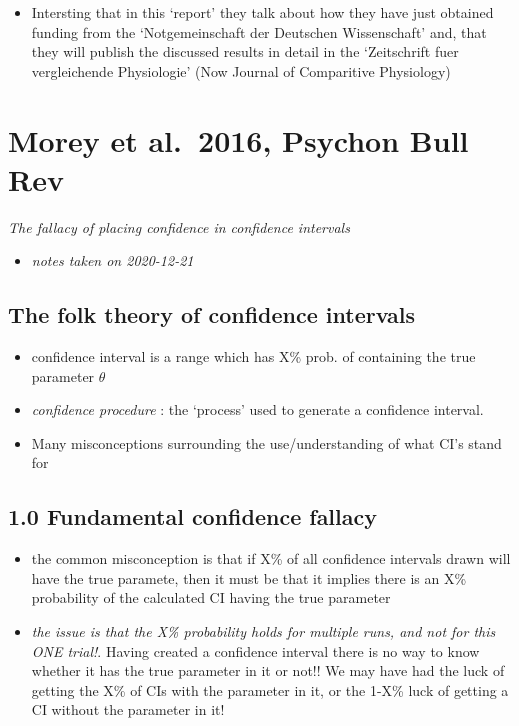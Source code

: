 \documentclass[
]{book}
\providecommand{\tightlist}{%
  \setlength{\itemsep}{0pt}\setlength{\parskip}{0pt}}
\begin{document}
\begin{itemize}
\tightlist
\item
  Intersting that in this `report' they talk about how they have just obtained funding from the `Notgemeinschaft der Deutschen Wissenschaft' and, that they will publish the discussed results in detail in the `Zeitschrift fuer vergleichende Physiologie' (Now Journal of Comparitive Physiology)
\end{itemize}

\hypertarget{morey-et-al.-2016-psychon-bull-rev}{%
\chapter{Morey et al.~2016, Psychon Bull Rev}\label{morey-et-al.-2016-psychon-bull-rev}}


\emph{The fallacy of placing confidence in confidence intervals} \citep{morey2016fallacy}

\begin{itemize}
\tightlist
\item
  \emph{notes taken on 2020-12-21}
\end{itemize}

\hypertarget{the-folk-theory-of-confidence-intervals}{%
\section{The folk theory of confidence intervals}\label{the-folk-theory-of-confidence-intervals}}

\begin{itemize}
\tightlist
\item
  confidence interval is a range which has X\% prob. of containing the true parameter \(\theta\)
\item
  \emph{confidence procedure} : the `process' used to generate a confidence interval.
\item
  Many misconceptions surrounding the use/understanding of what CI's stand for
\end{itemize}

\hypertarget{fundamental-confidence-fallacy}{%
\section{1.0 Fundamental confidence fallacy}\label{fundamental-confidence-fallacy}}

\begin{itemize}
\tightlist
\item
  the common misconception is that if X\% of all confidence intervals drawn will have the true paramete, then it
  must be that it implies there is an X\% probability of the calculated CI having the true parameter
\item
  \emph{the issue is that the X\% probability holds for multiple runs, and not for this ONE trial!}. Having created a confidence interval
  there is no way to know whether it has the true parameter in it or not!! We may have had the luck of getting the X\% of CIs with the
  parameter in it, or the 1-X\% luck of getting a CI without the parameter in it!
\end{itemize}
\end{document}
